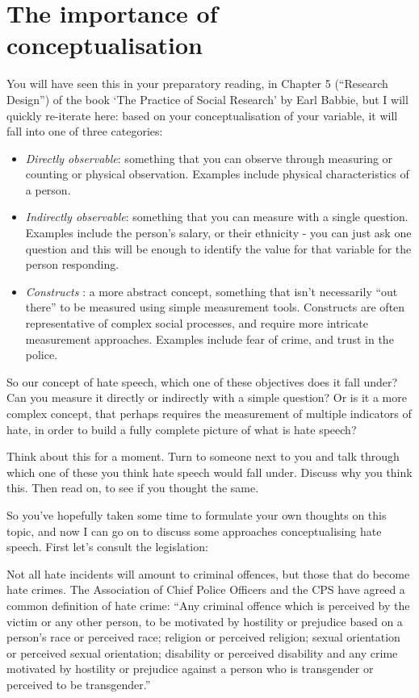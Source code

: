 \documentclass[
]{book}
\providecommand{\tightlist}{%
  \setlength{\itemsep}{0pt}\setlength{\parskip}{0pt}}
\begin{document}
\hypertarget{the-importance-of-conceptualisation}{%
\section{The importance of conceptualisation}\label{the-importance-of-conceptualisation}}

You will have seen this in your preparatory reading, in Chapter 5 (``Research Design'') of the book `The Practice of Social Research' by Earl Babbie, but I will quickly re-iterate here: based on your conceptualisation of your variable, it will fall into one of three categories:

\begin{itemize}
\tightlist
\item
  \emph{Directly observable}: something that you can observe through measuring or counting or physical observation. Examples include physical characteristics of a person.
\item
  \emph{Indirectly observable}: something that you can measure with a single question. Examples include the person's salary, or their ethnicity - you can just ask one question and this will be enough to identify the value for that variable for the person responding.
\item
  \emph{Constructs} : a more abstract concept, something that isn't necessarily ``out there'' to be measured using simple measurement tools. Constructs are often representative of complex social processes, and require more intricate measurement approaches. Examples include fear of crime, and trust in the police.
\end{itemize}

So our concept of hate speech, which one of these objectives does it fall under? Can you measure it directly or indirectly with a simple question? Or is it a more complex concept, that perhaps requires the measurement of multiple indicators of hate, in order to build a fully complete picture of what is hate speech?

Think about this for a moment. Turn to someone next to you and talk through which one of these you think hate speech would fall under. Discuss why you think this. Then read on, to see if you thought the same.

So you've hopefully taken some time to formulate your own thoughts on this topic, and now I can go on to discuss some approaches conceptualising hate speech. First let's consult the legislation:

Not all hate incidents will amount to criminal offences, but those that do become hate crimes. The Association of Chief Police Officers and the CPS have agreed a common definition of hate crime: ``Any criminal offence which is perceived by the victim or any other person, to be motivated by hostility or prejudice based on a person's race or perceived race; religion or perceived religion; sexual orientation or perceived sexual orientation; disability or perceived disability and any crime motivated by hostility or prejudice against a person who is transgender or perceived to be transgender.''
\end{document}
